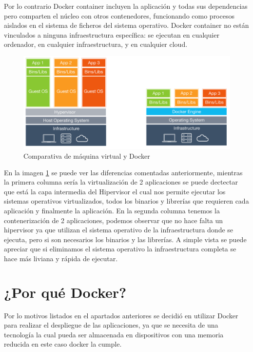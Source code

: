 Por lo contrario Docker container incluyen la aplicación y todas sus dependencias pero comparten el núcleo con otros contenedores, funcionando como procesos aislados en el sistema de ficheros del sistema operativo. Docker container no están vinculados a ninguna infraestructura específica: se ejecutan en cualquier ordenador, en cualquier infraestructura, y en cualquier cloud.

\begin{figure}[htb]
\begin{center}
\includegraphics[width=1\textwidth]{./setup/VrvsDocker}
\caption{Comparativa de máquina virtual y Docker}
\label{Vs:VrvsDocker}
\end{center}
\end{figure}

En la imagen \ref{Vs:VrvsDocker} se puede ver las diferencias comentadas anteriormente, mientras la primera columna sería la virtualización de 2 aplicaciones se puede dectectar que está la capa intermedia del Hipervisor el cual nos permite ejecutar los sistemas operativos virtualizados, todos los binarios y librerías que requieren cada aplicación y finalmente la aplicación. 
En la segunda columna tenemos la contenerización de 2 aplicaciones, podemos observar que no hace falta un hipervisor ya que utilizan el sistema operativo de la infraestructura donde se ejecuta, pero si son necesarios los binarios y las librerías.
A simple vista se puede apreciar que si eliminamos el sistema operativo la infraestructura completa se hace más liviana y rápida de ejecutar.

\section{¿Por qué Docker?}

Por lo motivos listados en el apartados anteriores se decidió en utilizar Docker para realizar el despliegue de las aplicaciones, ya que se necesita de una tecnología la cual pueda ser almacenada en dispositivos con una memoria reducida en este caso docker la cumple. 

